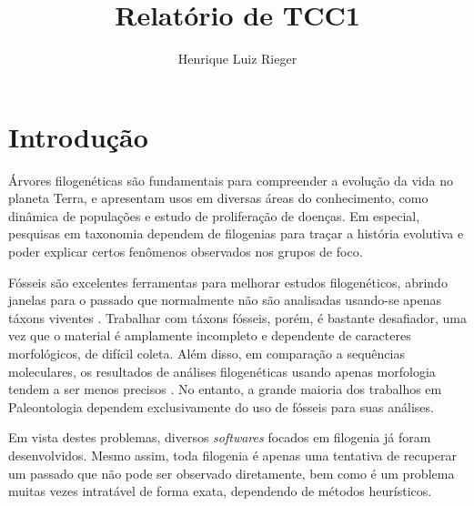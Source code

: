 \documentclass[12pt]{article}
\title{Relatório de TCC1}
\author{Henrique Luiz Rieger\inst{1}}
\begin{document}
 

\maketitle

\begin{resumo} 
\end{resumo}

\begin{abstract}
\end{abstract}

\section{Introdução}

Árvores filogenéticas são fundamentais para compreender a evolução da vida no planeta Terra, e apresentam usos em diversas áreas do conhecimento, como dinâmica de populações e estudo de proliferação de doenças. Em especial, pesquisas em taxonomia dependem de filogenias para traçar a história evolutiva e poder explicar certos fenômenos observados nos grupos de foco.

Fósseis são excelentes ferramentas para melhorar estudos filogenéticos, abrindo janelas para o passado que normalmente não são analisadas usando-se apenas táxons viventes \cite{mongiardino2021fossils}. Trabalhar com táxons fósseis, porém, é bastante desafiador, uma vez que o material é amplamente incompleto e dependente de caracteres morfológicos, de difícil coleta. Além disso, em comparação a sequências moleculares, os resultados de análises filogenéticas usando apenas morfologia tendem a ser menos precisos \cite{berger2010accuracy}. No entanto, a grande maioria dos trabalhos em Paleontologia dependem exclusivamente do uso de fósseis para suas análises.

Em vista destes problemas, diversos \emph{softwares} focados em filogenia já foram desenvolvidos. Mesmo assim, toda filogenia é apenas uma tentativa de recuperar um passado que não pode ser observado diretamente, bem como é um problema muitas vezes intratável de forma exata, dependendo de métodos heurísticos.
\end{document}
